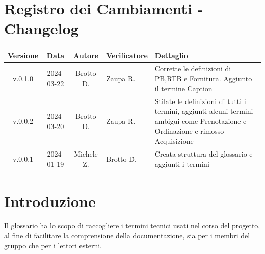 \documentclass[12pt, oneside]{article}
\begin{document}
\section*{Registro dei Cambiamenti - Changelog}
\begin{tabular}{|c|c|c|p{3cm}|p{6cm}|}
\hline
\textbf{Versione} & \textbf{Data} & \textbf{Autore} & \textbf{Verificatore} & \textbf{Dettaglio} \\
\hline
v.0.1.0 & 2024-03-22 & Brotto D. & Zaupa R. & Corrette le definizioni di PB,RTB e Fornitura. Aggiunto il termine Caption\\
\hline
v.0.0.2 & 2024-03-20 & Brotto D. & Zaupa R. & Stilate le definizioni di tutti i termini, aggiunti alcuni termini ambigui come Prenotazione e Ordinazione e rimosso Acquisizione \\
\hline
v.0.0.1 & 2024-01-19 & Michele Z. & Brotto D. & Creata struttura del glossario e aggiunti i termini \\
\hline
\end{tabular}
\newpage

\tableofcontents
\newpage
\section{Introduzione}
Il glossario ha lo scopo di raccogliere i termini tecnici usati nel corso del progetto, al fine di facilitare la comprensione della documentazione, sia per i membri del gruppo che per i lettori esterni.
\newpage

\newpage

\newpage

\newpage

\newpage

\newpage

\newpage

\newpage

\newpage

\newpage

\newpage

\newpage

\newpage

\newpage

\newpage

\newpage

\newpage

\newpage

\newpage

\newpage

\newpage

\newpage

\newpage

\newpage

\newpage

\newpage

\end{document}
